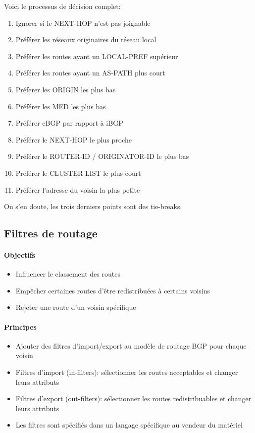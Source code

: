 \documentclass{article}
\begin{document}
\begin{sffamily}
Voici le processus de décision complet:

\begin{enumerate}
\item Ignorer si le NEXT-HOP n'est pas joignable
\item Préférer les réseaux originaires du réseau local
\item Préférer les routes ayant un LOCAL-PREF supérieur
\item Préférer les routes ayant un AS-PATH plus court
\item Préferer les ORIGIN les plus bas
\item Préférer les MED les plus bas
\item Préférer eBGP par rapport à iBGP
\item Préférer le NEXT-HOP le plus proche
\item Préférer le ROUTER-ID / ORIGINATOR-ID le plus bas
\item Préférer le CLUSTER-LIST le plus court
\item Préférer l'adresse du voisin la plus petite
\end{enumerate}

On s'en doute, les trois derniers points sont des tie-breaks.

\subsection{Filtres de routage}

\paragraph{Objectifs}

\begin{itemize}
\item Influencer le classement des routes
\item Empêcher certaines routes d'être redistribuées à certains voisins
\item Rejeter une route d'un voisin spécifique
\end{itemize}

\paragraph{Principes}

\begin{itemize}
\item Ajouter des filtres d'import/export au modèle de routage BGP
  pour chaque voisin
\item Filtres d'import (in-filters): sélectionner les routes
  acceptables et changer leurs attributs
\item Filtres d'export (out-filters): sélectionner les routes
  redistribuables et changer leurs attributs
\item Les filtres sont spécifiés dans un langage spécifique au vendeur
  du matériel
\end{itemize}


\end{sffamily}
\end{document}
